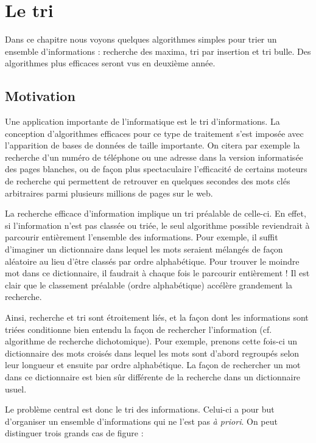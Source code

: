 \chapter{Le tri}

		Dans ce chapitre nous voyons quelques algorithmes simples pour trier un
		ensemble d'informations : recherche des maxima, tri
		par insertion et tri bulle. Des algorithmes plus efficaces seront vus
		en deuxième année.


\section{Motivation}

	Une application importante de l’informatique est le tri d’informations.
	La conception d’algorithmes efficaces pour ce type de traitement s’est
	imposée avec l’apparition de bases de données de taille importante. On
	citera par exemple la recherche d’un numéro de téléphone ou une adresse
	dans la version informatisée des pages blanches, ou de façon plus
	spectaculaire l’efficacité de certains moteurs de recherche qui
	permettent de retrouver en quelques secondes des mots clés arbitraires
	parmi plusieurs millions de pages sur le web.


	La recherche efficace d’information implique un tri préalable de
	celle-ci. En effet, si l’information n’est pas classée ou triée, le
	seul algorithme possible reviendrait à parcourir entièrement l’ensemble
	des informations. Pour exemple, il suffit d’imaginer un dictionnaire
	dans lequel les mots seraient mélangés de façon aléatoire au lieu
	d’être classés par ordre alphabétique. Pour trouver le moindre mot dans
	ce dictionnaire, il faudrait à chaque fois le parcourir entièrement !
	Il est clair que le classement préalable (ordre alphabétique) accélère
	grandement la recherche.


	Ainsi, recherche et tri sont étroitement liés, et la façon dont les
	informations sont triées conditionne bien entendu la façon de
	rechercher l’information (cf. algorithme de recherche dichotomique).
	Pour exemple, prenons cette fois-ci un dictionnaire des mots croisés
	dans lequel les mots sont d’abord regroupés selon leur longueur et
	ensuite par ordre alphabétique. La façon de rechercher un mot dans ce
	dictionnaire est bien sûr différente de la recherche dans un
	dictionnaire usuel. 

	Le problème central est donc le tri des informations. Celui-ci a pour
	but d’organiser un ensemble d’informations qui ne l’est pas \textit{à
	priori}. On peut distinguer trois grands cas de figure :

